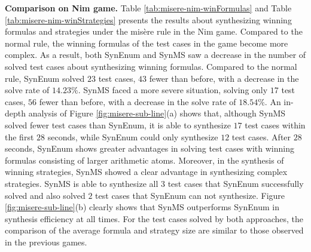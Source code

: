 \documentclass[review]{elsarticle}
\begin{document}
\textbf{Comparison on Nim game.}
Table \ref{tab:misere-nim-winFormulas} and Table \ref{tab:misere-nim-winStrategies} presents the results about synthesizing winning formulas and strategies under the mis\`{e}re rule in the Nim game. 
Compared to the normal rule, the winning formulas of the test cases in the game become more complex. As a result, both SynEnum and SynMS saw a decrease in the number of solved test cases about synthesizing winning formulas. Compared to the normal rule, SynEnum solved $23$ test cases, $43$ fewer than before, with a decrease in the solve rate of $14.23\%$. SynMS faced a more severe situation, solving only $17$ test cases, $56$ fewer than before, with a decrease in the solve rate of $18.54\%$. An in-depth analysis of Figure \ref{fig:misere-sub-line}(a) shows that, although SynMS solved fewer test cases than SynEnum, it is able to synthesize $17$ test cases within the first $28$ seconds, while SynEnum could only synthesize $12$ test cases. After $28$ seconds, SynEnum shows greater advantages in solving test cases with winning formulas consisting of larger arithmetic atoms. Moreover, in the synthesis of winning strategies, SynMS showed a clear advantage in synthesizing complex strategies. SynMS is able to synthesize all $3$ test cases that SynEnum successfully solved and also solved $2$ test cases that SynEnum can not synthesize. Figure \ref{fig:misere-sub-line}(b) clearly shows that SynMS outperforms SynEnum in synthesis efficiency at all times. For the test cases solved by both approaches, the comparison of the average formula and strategy size are similar to those observed in the previous games.
\end{document}
